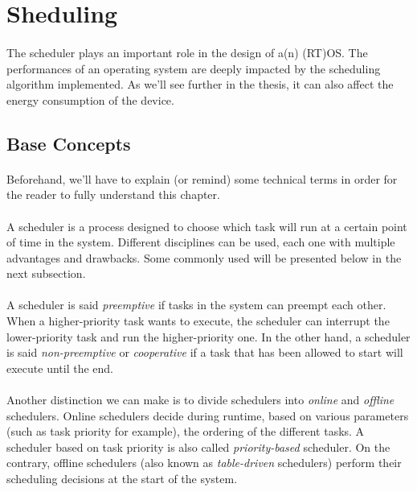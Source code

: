 \section{Sheduling}

\paragraph{}
The scheduler plays an important role in the design of a(n) (RT)OS.
The performances of an operating system are deeply impacted by the scheduling algorithm implemented.
As we'll see further in the thesis, it can also affect the energy consumption of the device.\\

\subsection{Base Concepts}
\paragraph{}
Beforehand, we'll have to explain (or remind) some technical terms in order for the reader to fully understand this chapter.

\paragraph{}
A scheduler is a process designed to choose which task will run at a certain point of time in the system.
Different disciplines can be used, each one with multiple advantages and drawbacks.
Some commonly used will be presented below in the next subsection.

\paragraph{}
A scheduler is said \textit{preemptive} if tasks in the system can preempt each other.
When a higher-priority task wants to execute, the scheduler can interrupt the lower-priority task and run the higher-priority one.
In the other hand, a scheduler is said \textit{non-preemptive} or \textit{cooperative}
    if a task that has been allowed to start will execute until the end.

\paragraph{}
Another distinction we can make is to divide schedulers into \textit{online} and \textit{offline} schedulers.
Online schedulers decide during runtime, based on various parameters (such as task priority for example), the ordering of the different tasks.
A scheduler based on task priority is also called \textit{priority-based} scheduler.
On the contrary, offline schedulers (also known as \textit{table-driven} schedulers) perform their scheduling decisions at the start of the system.

